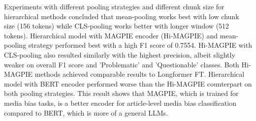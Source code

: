 Experiments with different pooling strategies and different chunk size for hierarchical methods concluded that mean-pooling works best with low chunk size (156 tokens) while CLS-pooling works better with longer window (512 tokens). Hierarchical model with MAGPIE encoder (Hi-MAGPIE) and mean-pooling strategy performed best with a high F1 score of 0.7554. Hi-MAGPIE with CLS-pooling also resulted similarly with the highest precision, albeit slightly weaker on overall F1 score and 'Problematic' and 'Questionable' classes. Both Hi-MAGPIE methods achieved comparable results to Longformer FT. Hierarchical model with BERT encoder performed worse than the Hi-MAGPIE counterpart on both pooling strategies. This result shows that MAGPIE, which is trained for media bias tasks, is a better encoder for article-level media bias classification compared to BERT, which is more of a general LLMs.



